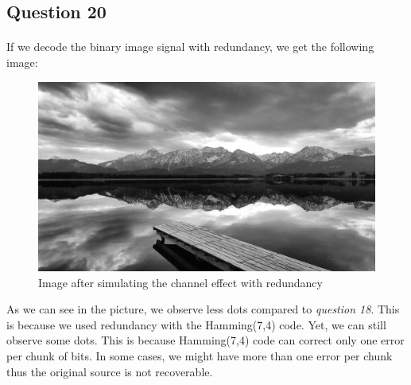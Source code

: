 \documentclass[a4paper, 11pt, oneside]{article}
\begin{document}

\subsection{Question 20}
\paragraph{}If we decode the binary image signal with redundancy, we get the following image:
\begin{figure}[H]
    \centering
    \includegraphics[scale=0.2]{q20.png}
    \caption{Image after simulating the channel effect with redundancy}
\end{figure}
As we can see in the picture, we observe less dots compared to \textit{question 18}. This is because we used redundancy with the Hamming(7,4) code.
Yet, we can still observe some dots. This is because Hamming(7,4) code can correct only one error per chunk of bits. In some cases, we might have more
than one error per chunk thus the original source is not recoverable.
\end{document}
